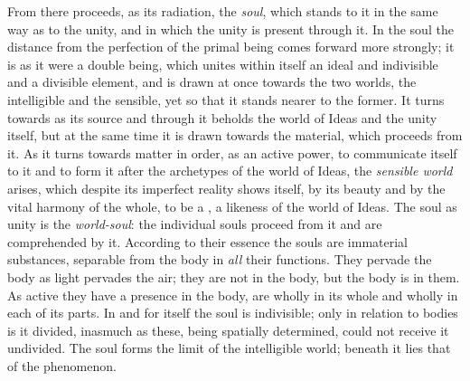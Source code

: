 From  there proceeds, as its radiation, the \emph{soul}, which
stands to it in the same way as  to the unity, and in which the
unity is present through it. In the soul the distance from the
perfection of the primal being comes forward more strongly; it is as it
were a double being, which unites within itself an ideal and
indivisible and a divisible element, and is drawn at once towards the
two worlds, the intelligible and the sensible, yet so that it stands
nearer to the former. It turns towards  as its source and
through it beholds the world of Ideas and the unity itself, but at the
same time it is drawn towards the material, which proceeds from it. As
it turns towards matter in order, as an active power, to communicate
itself to it and to form it after the archetypes of the world of Ideas,
the \emph{sensible world} arises, which despite its imperfect reality
shows itself, by its beauty and by the vital harmony of the whole, to be
a , a likeness of the world of Ideas. The soul as unity is the
\emph{world-soul}: the individual souls proceed from it and are
comprehended by it. According to their essence the souls are immaterial
substances, separable from the body in \emph{all} their functions. They
pervade the body as light pervades the air; they are not in the body,
but the body is in them. As active they have a presence in the body,
are wholly in its whole and wholly in each of its parts. In and for
itself the soul is indivisible; only in relation to bodies is it
divided, inasmuch as these, being spatially determined, could not
receive it undivided. The soul forms the limit of the intelligible
world; beneath it lies that of the phenomenon.

